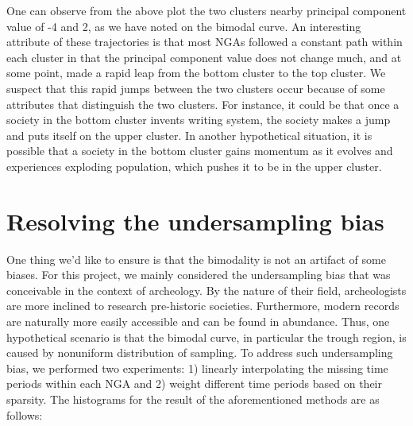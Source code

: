 \documentclass[11pt]{article}
\begin{document}
One can observe from the above plot the two clusters nearby principal component value of -4 and 2, as we have noted on the bimodal curve. An interesting attribute of these trajectories is that most NGAs followed a constant path within each cluster in that the principal component value does not change much, and at some point, made a rapid leap from the bottom cluster to the top cluster. We suspect that this rapid jumps between the two clusters occur because of some attributes that distinguish the two clusters. For instance, it could be that once a society in the bottom cluster invents writing system, the society makes a jump and puts itself on the upper cluster. In another hypothetical situation, it is possible that a society in the bottom cluster gains momentum as it evolves and experiences exploding population, which pushes it to be in the upper cluster. 

\section{Resolving the undersampling bias}

One thing we'd like to ensure is that the bimodality is not an artifact of some biases. For this project, we mainly considered the undersampling bias that was conceivable in the context of archeology. By the nature of their field, archeologists are more inclined to research pre-historic societies. Furthermore, modern records are naturally more easily accessible and can be found in abundance. Thus, one hypothetical scenario is that the bimodal curve, in particular the trough region, is caused by nonuniform distribution of sampling. To address such undersampling bias, we performed two experiments: 1) linearly interpolating the missing time periods within each NGA and 2) weight different time periods based on their sparsity. The histograms for the result of the aforementioned methods are as follows:
\end{document}
